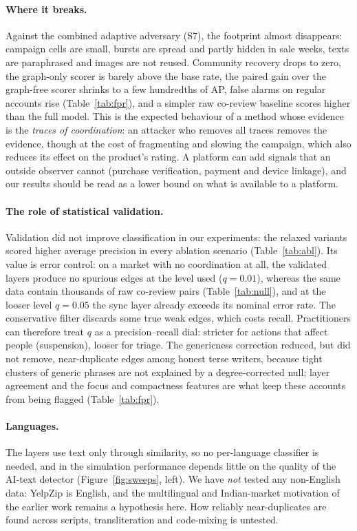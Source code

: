 \documentclass[pdflatex,sn-basic]{sn-jnl}
\theoremstyle{thmstyleone}
\theoremstyle{thmstylethree}
\begin{document}
\paragraph{Where it breaks.} Against the combined adaptive adversary (S7), the footprint almost disappears: campaign cells are small, bursts are spread and partly hidden in sale weeks, texts are paraphrased and images are not reused. Community recovery drops to zero, the graph-only scorer is barely above the base rate, the paired gain over the graph-free scorer shrinks to a few hundredths of AP, false alarms on regular accounts rise (Table~\ref{tab:fpr}), and a simpler raw co-review baseline scores higher than the full model. This is the expected behaviour of a method whose evidence is the \emph{traces of coordination}: an attacker who removes all traces removes the evidence, though at the cost of fragmenting and slowing the campaign, which also reduces its effect on the product's rating. A platform can add signals that an outside observer cannot (purchase verification, payment and device linkage), and our results should be read as a lower bound on what is available to a platform.

\paragraph{The role of statistical validation.} Validation did not improve classification in our experiments: the relaxed variants scored higher average precision in every ablation scenario (Table~\ref{tab:abl}). Its value is error control: on a market with no coordination at all, the validated layers produce no spurious edges at the level used ($q=0.01$), whereas the same data contain thousands of raw co-review pairs (Table~\ref{tab:null}), and at the looser level $q=0.05$ the sync layer already exceeds its nominal error rate. The conservative filter discards some true weak edges, which costs recall. Practitioners can therefore treat $q$ as a precision--recall dial: stricter for actions that affect people (suspension), looser for triage. The genericness correction reduced, but did not remove, near-duplicate edges among honest terse writers, because tight clusters of generic phrases are not explained by a degree-corrected null; layer agreement and the focus and compactness features are what keep these accounts from being flagged (Table~\ref{tab:fpr}).

\paragraph{Languages.} The layers use text only through similarity, so no per-language classifier is needed, and in the simulation performance depends little on the quality of the AI-text detector (Figure~\ref{fig:sweeps}, left). We have \emph{not} tested any non-English data: YelpZip is English, and the multilingual and Indian-market motivation of the earlier work remains a hypothesis here. How reliably near-duplicates are found across scripts, transliteration and code-mixing is untested.
\end{document}
